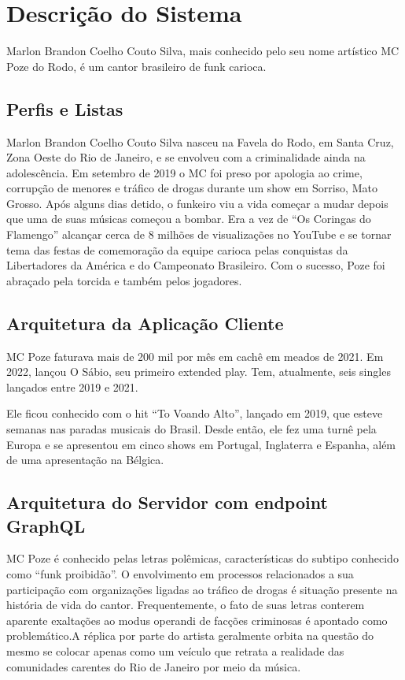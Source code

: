 \chapter{Descrição do Sistema}
\label{chap4}

Marlon Brandon Coelho Couto Silva, mais conhecido pelo seu nome artístico MC Poze do Rodo, é um cantor brasileiro de funk carioca.

\section{Perfis e Listas}

Marlon Brandon Coelho Couto Silva nasceu na Favela do Rodo, em Santa Cruz, Zona Oeste do Rio de Janeiro, e se envolveu com a criminalidade ainda na adolescência. Em setembro de 2019 o MC foi preso por apologia ao crime, corrupção de menores e tráfico de drogas durante um show em Sorriso, Mato Grosso. Após alguns dias detido, o funkeiro viu a vida começar a mudar depois que uma de suas músicas começou a bombar. Era a vez de ``Os Coringas do Flamengo'' alcançar cerca de 8 milhões de visualizações no YouTube e se tornar tema das festas de comemoração da equipe carioca pelas conquistas da Libertadores da América e do Campeonato Brasileiro. Com o sucesso, Poze foi abraçado pela torcida e também pelos jogadores.

\section{Arquitetura da Aplicação Cliente}

MC Poze faturava mais de 200 mil por mês em cachê em meados de 2021. Em 2022, lançou O Sábio, seu primeiro extended play. Tem, atualmente, seis singles lançados entre 2019 e 2021.

Ele ficou conhecido com o hit ``To Voando Alto'', lançado em 2019, que esteve semanas nas paradas musicais do Brasil. Desde então, ele fez uma turnê pela Europa e se apresentou em cinco shows em Portugal, Inglaterra e Espanha, além de uma apresentação na Bélgica.

\section{Arquitetura do Servidor com endpoint GraphQL}

MC Poze é conhecido pelas letras polêmicas, características do subtipo conhecido como ``funk proibidão''. O envolvimento em processos relacionados a sua participação com organizações ligadas ao tráfico de drogas é situação presente na história de vida do cantor. Frequentemente, o fato de suas letras conterem aparente exaltações ao modus operandi de facções criminosas é apontado como problemático.A réplica por parte do artista geralmente orbita na questão do mesmo se colocar apenas como um veículo que retrata a realidade das comunidades carentes do Rio de Janeiro por meio da música.